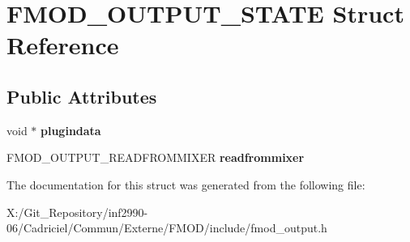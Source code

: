 \hypertarget{struct_f_m_o_d___o_u_t_p_u_t___s_t_a_t_e}{\section{F\-M\-O\-D\-\_\-\-O\-U\-T\-P\-U\-T\-\_\-\-S\-T\-A\-T\-E Struct Reference}
\label{struct_f_m_o_d___o_u_t_p_u_t___s_t_a_t_e}
}
\subsection*{Public Attributes}
\begin{DoxyCompactItemize}
\item 
\hypertarget{struct_f_m_o_d___o_u_t_p_u_t___s_t_a_t_e_a08d52689c8b698c0ea363c7403e8978b}{void $\ast$ {\bfseries plugindata}}\label{struct_f_m_o_d___o_u_t_p_u_t___s_t_a_t_e_a08d52689c8b698c0ea363c7403e8978b}

\item 
\hypertarget{struct_f_m_o_d___o_u_t_p_u_t___s_t_a_t_e_a297cdb7fbba2150340cceecf8d4c9ca1}{F\-M\-O\-D\-\_\-\-O\-U\-T\-P\-U\-T\-\_\-\-R\-E\-A\-D\-F\-R\-O\-M\-M\-I\-X\-E\-R {\bfseries readfrommixer}}\label{struct_f_m_o_d___o_u_t_p_u_t___s_t_a_t_e_a297cdb7fbba2150340cceecf8d4c9ca1}

\end{DoxyCompactItemize}


The documentation for this struct was generated from the following file\-:\begin{DoxyCompactItemize}
\item 
X\-:/\-Git\-\_\-\-Repository/inf2990-\/06/\-Cadriciel/\-Commun/\-Externe/\-F\-M\-O\-D/include/fmod\-\_\-output.\-h\end{DoxyCompactItemize}
